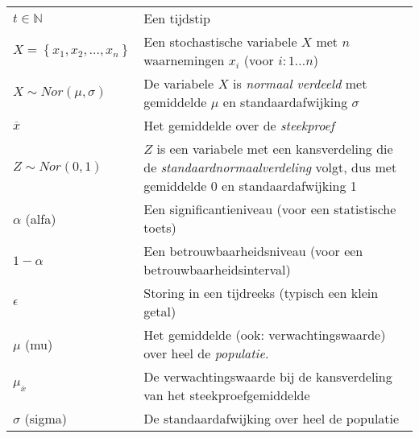 \begin{table}
\begin{tabular}{p{}p{}}
  	$t \in \mathbb{N}$                                      & Een tijdstip                                                                                                                           \\
  	$X = \left\{x_1, x_2, \ldots, x_n \right\}$             & Een stochastische variabele $X$ met $n$ waarnemingen $x_i$ (voor $i: 1 \ldots n$)                                                      \\
  	$X \sim Nor(\mu, \sigma)$                               & De variabele $X$ is \emph{normaal verdeeld} met gemiddelde $\mu$ en standaardafwijking $\sigma$                                        \\
  	$\overline{x}$                                          & Het gemiddelde over de \emph{steekproef}                                                                                               \\
  	$Z \sim Nor(0, 1)$                                      & $Z$ is een variabele met een kansverdeling die de \emph{standaardnormaalverdeling} volgt, dus met gemiddelde 0 en standaardafwijking 1 \\
  	$\alpha$ (alfa)                                         & Een significantieniveau (voor een statistische toets)                                                                                  \\
  	$1 - \alpha$                                            & Een betrouwbaarheidsniveau (voor een betrouwbaarheidsinterval)                                                                         \\
  	$\epsilon$                                              & Storing in een tijdreeks (typisch een klein getal)                                                                                     \\
  	$\mu$ (mu)                                              & Het gemiddelde (ook: verwachtingswaarde) over heel de \emph{populatie}.                                                                \\
  	$\mu_{\overline{x}}$                                    & De verwachtingswaarde bij de kansverdeling van het steekproefgemiddelde                                                                \\
  	$\sigma$ (sigma)                                        & De standaardafwijking over heel de populatie                                                                                           \\

\end{tabular}
\end{table}
